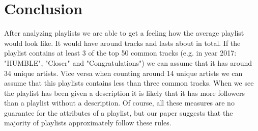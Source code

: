 \section{Conclusion}

After analyzing  playlists we are able to get a feeling how the average  playlist would look like. It would have around  tracks and lasts about  in total. If the playlist contains at least 3  of the top 50 common tracks (e.g. in year 2017: "HUMBLE", "Closer" and "Congratulations") we can assume that it has around 34 unique artists. Vice versa when counting around 14 unique artists we can assume that this playlists contains less than three common tracks. When we see the playlist has been given a description it is likely that it has more followers than a playlist without a description. Of course, all these measures are no guarantee for the attributes of a playlist, but our paper suggests that the majority of playlists approximately follow these rules.